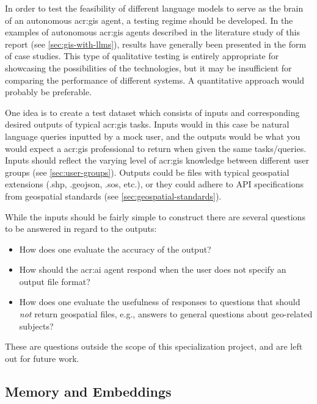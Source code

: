In order to test the feasibility of different language models to serve as the brain of an autonomous \acrshort{acr:gis} agent, a testing regime should be developed. In the examples of autonomous \acrshort{acr:gis} agents described in the literature study of this report (see \autoref{sec:gis-with-llms}), results have generally been presented in the form of case studies. This type of qualitative testing is entirely appropriate for showcasing the possibilities of the technologies, but it may be insufficient for comparing the performance of different systems. A quantitative approach would probably be preferable.

One idea is to create a test dataset which consists of inputs and corresponding desired outputs of typical \acrshort{acr:gis} tasks. Inputs would in this case be natural language queries inputted by a mock user, and the outputs would be what you would expect a \acrshort{acr:gis} professional to return when given the same tasks/queries. Inputs should reflect the varying level of \acrshort{acr:gis} knowledge between different user groups (see \autoref{sec:user-groups}). Outputs could be files with typical geospatial extensions (.shp, .geojson, .sos, etc.), or they could adhere to API specifications from geospatial standards (see \autoref{sec:geospatial-standards}).

While the inputs should be fairly simple to construct there are several questions to be answered in regard to the outputs:

\begin{itemize}
    \item How does one evaluate the accuracy of the output?
    \item How should the \acrshort{acr:ai} agent respond when the user does not specify an output file format?
    \item How does one evaluate the usefulness of responses to questions that should \textit{not} return geospatial files, e.g., answers to general questions about geo-related subjects?
\end{itemize}

\noindent These are questions outside the scope of this specialization project, and are left out for future work.

\subsection{Memory and Embeddings}\label{subsec:memory-and-embeddings}

